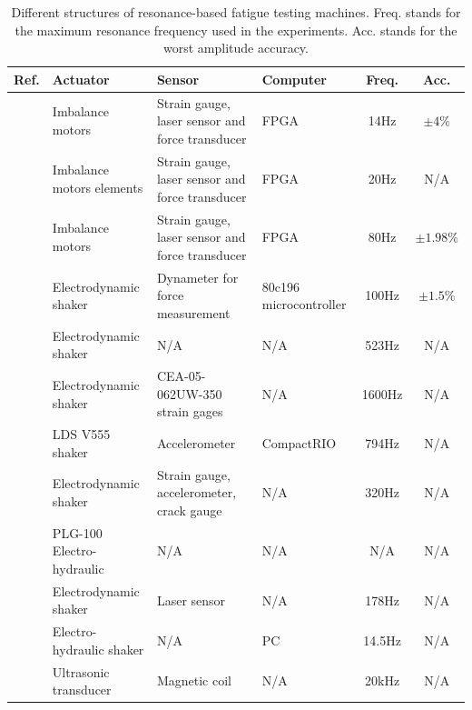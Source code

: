 \documentclass[preprint,12pt]{elsarticle}
\begin{document}
\begin{table}
\center
    \begin{tabular}{|l|l|l|l|c|c|} \hline
     Ref.   &  Actuator  & Sensor & Computer &  Freq. &  Acc. \\ \hline
     \cite{SCHRAMM2024117045}   & Imbalance motors &   Strain gauge, laser sensor and force transducer & FPGA  & 14Hz &    $\pm 4\%$\\ \hline
\cite{SCHNEIDER2018171}   & Imbalance motors elements  &  Strain gauge, laser sensor and force transducer & FPGA  & 20Hz  &   N/A \\  \hline

\cite{herrmann2018simulation_Thesis} & Imbalance motors &   Strain gauge, laser sensor and force transducer  & FPGA   & 80Hz &  $\pm 1.98\%$  \\    \hline

\cite{feng2003development_Japaneese}   & Electrodynamic shaker &  Dynameter for force measurement  & 80c196 microcontroller & 100Hz  &  $\pm 1.5\%$ \\ \hline

\cite{Su2014} & Electrodynamic shaker   & N/A & N/A &  523Hz & N/A   \\ \hline

\cite{George_2006} & Electrodynamic shaker    & CEA-05-062UW-350 strain gages & N/A  &  1600Hz & N/A \\ \hline
\cite{CESNIK20125370} & LDS V555 shaker  &  Accelerometer & CompactRIO &  794Hz &  N/A \\  \hline
\cite{gautrelet2020resonance} & Electrodynamic shaker &  Strain gauge, accelerometer,  crack gauge &  N/A & 320Hz & N/A  \\  \hline 


\cite{Ji_2010} &  PLG-100 Electro-hydraulic & N/A & N/A  &  N/A  & N/A  \\  \hline


\cite{DORANGA2024115368} & Electrodynamic shaker & Laser sensor & N/A  & 178Hz & N/A \\ \hline

\cite{Rouillard_2000} & Electro-hydraulic shaker & N/A & PC & 14.5Hz & N/A \\\hline

\cite{Stanzl01041980_fast_ultrasonic} & Ultrasonic transducer & Magnetic coil  & N/A  & 20kHz & N/A \\
           \hline
    \end{tabular}
    \vspace{0.1cm}
    \caption{Different structures of resonance-based fatigue testing machines. Freq. stands for the maximum resonance frequency used in the experiments. Acc. stands for the worst amplitude accuracy.}
    \label{T_machine_types}
\end{table}
\end{document}
